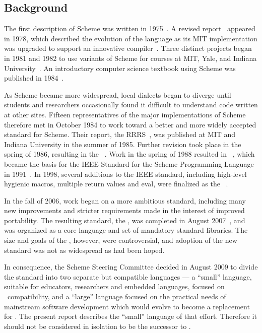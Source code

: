\subsection*{Background}

\vest The first description of Scheme was written in
1975~\cite{Scheme75}.  A revised report~\cite{Scheme78}
appeared in 1978, which described the evolution
of the language as its MIT implementation was upgraded to support an
innovative compiler~\cite{Rabbit}.  Three distinct projects began in
1981 and 1982 to use variants of Scheme for courses at MIT, Yale, and
Indiana University~\cite{Rees82,MITScheme,Scheme311}.  An introductory
computer science textbook using Scheme was published in
1984~\cite{SICP}.

\vest As Scheme became more widespread,
local dialects began to diverge until students and researchers
occasionally found it difficult to understand code written at other
sites.
Fifteen representatives of the major implementations of Scheme therefore
met in October 1984 to work toward a better and more widely accepted
standard for Scheme.
Their report, the RRRS~\cite{RRRS},
was published at MIT and Indiana University in the summer of 1985.
Further revision took place in the spring of 1986, resulting in the
\rthreers~\cite{R3RS}.
Work in the spring of 1988 resulted in \rfourrs~\cite{R4RS},
which became the basis for the
IEEE Standard for the Scheme Programming Language in 1991~\cite{IEEEScheme}.
In 1998, several additions to the IEEE standard, including high-level
hygienic macros, multiple return values and {\cf eval}, were finalized
as the \rfivers~\cite{R5RS}.


In the fall of 2006, work began on a more ambitious standard,
including many new improvements and stricter requirements made in the
interest of improved portability.  The resulting standard, the
\rsixrs, was completed in August 2007~\cite{R6RS}, and was organized
as a core language and set of mandatory standard libraries.  The size and goals
of the \rsixrs, however, were controversial, and adoption of the new
standard was not as widespread as had been hoped.

In consequence, the Scheme Steering Committee decided in August 2009 to divide the
standard into two separate but compatible languages --- a ``small''
language, suitable for educators, researchers and embedded languages,
focused on \rfivers~compatibility, and a ``large'' language focused
on the practical needs of mainstream software development
which would evolve to become a replacement for \rsixrs.
The present report describes the ``small'' language of that effort.
Therefore it should not be considered in isolation to be the successor
to \rsixrs.



